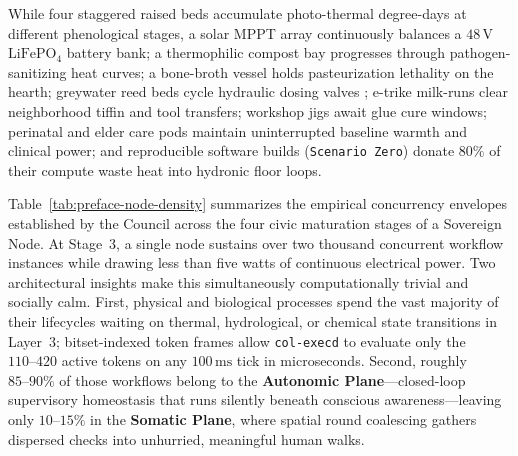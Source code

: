 While four staggered raised beds accumulate photo-thermal degree-days at different
phenological stages, a solar MPPT array continuously balances a $48\,\mathrm{V}$
$\mathrm{LiFePO_4}$ battery bank; a thermophilic compost bay progresses through
pathogen-sanitizing heat curves; a bone-broth vessel holds pasteurization lethality on the
hearth; greywater reed beds cycle hydraulic dosing valves \parencite{kadlec1996}; e-trike
milk-runs clear neighborhood tiffin and tool transfers; workshop jigs await glue cure
windows; perinatal and elder care pods maintain uninterrupted baseline warmth and clinical
power; and reproducible software builds (\texttt{Scenario Zero}) donate $80\%$ of their
compute waste heat into hydronic floor loops.

\begin{table}[htbp]
\centering
\caption{Empirical Workflow Density and Compute Budget Across Sovereign Node Maturation Stages}
\label{tab:preface-node-density}
\small
{}
\end{table}

Table~\ref{tab:preface-node-density} summarizes the empirical concurrency envelopes
established by the Council across the four civic maturation stages of a Sovereign Node. At
Stage~3, a single node sustains over two thousand concurrent workflow instances while
drawing less than five watts of continuous electrical power. Two architectural insights make
this simultaneously computationally trivial and socially calm. First, physical and
biological processes spend the vast majority of their lifecycles waiting on thermal,
hydrological, or chemical state transitions in Layer~3; bitset-indexed token frames allow
\texttt{col-execd} to evaluate only the $110\text{--}420$ active tokens on any
$100\,\mathrm{ms}$ tick in microseconds. Second, roughly $85\text{--}90\%$ of those
workflows belong to the \textbf{Autonomic Plane}---closed-loop supervisory homeostasis that
runs silently beneath conscious awareness---leaving only $10\text{--}15\%$ in the
\textbf{Somatic Plane}, where spatial round coalescing gathers dispersed checks into
unhurried, meaningful human walks.

